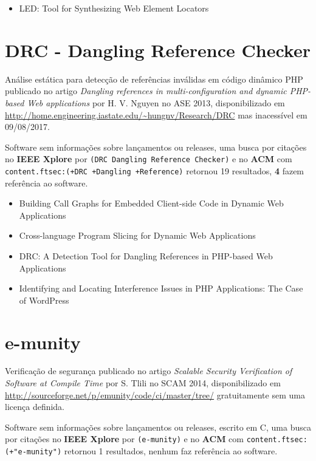\begin{itemize}
\item LED: Tool for Synthesizing Web Element Locators
\end{itemize}


\section{DRC - Dangling Reference Checker}

Análise estática para detecção de referências inválidas em código dinâmico PHP
publicado no artigo {\it Dangling references in multi-configuration and dynamic PHP-based Web applications}
por H. V. Nguyen
no ASE 2013,
disponibilizado em \url{http://home.engineering.iastate.edu/~hungnv/Research/DRC}
mas inacessível em 09/08/2017.

Software sem informações sobre lançamentos ou releases,
uma busca por citações no {\bf IEEE Xplore} por
\texttt{(DRC Dangling Reference Checker)}
e no {\bf ACM} com
\texttt{content.ftsec:(+DRC +Dangling +Reference)}
retornou
19 resultados,
{\bf 4} fazem referência ao software.

\begin{itemize}
\item Building Call Graphs for Embedded Client-side Code in Dynamic Web Applications
\item Cross-language Program Slicing for Dynamic Web Applications
\item DRC: A Detection Tool for Dangling References in PHP-based Web Applications
\item Identifying and Locating Interference Issues in PHP Applications: The Case of WordPress
\end{itemize}


\section{e-munity}

Verificação de segurança
publicado no artigo {\it Scalable Security Verification of Software at Compile Time}
por S. Tlili
no SCAM 2014,
disponibilizado em \url{http://sourceforge.net/p/emunity/code/ci/master/tree/}
gratuitamente
sem uma licença definida.

Software sem informações sobre lançamentos ou releases,
escrito em C,
uma busca por citações no {\bf IEEE Xplore} por
\texttt{(e-munity)}
e no {\bf ACM} com
\texttt{content.ftsec:(+"e-munity")}
retornou
1 resultados,
nenhum faz referência ao software.



